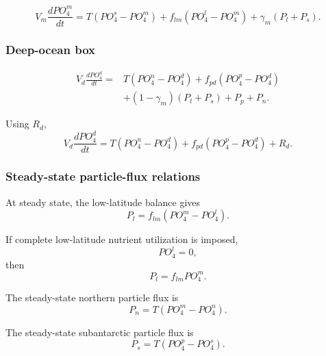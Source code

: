 \documentclass[11pt]{article}
\begin{document}
\begin{equation}
V_m\frac{dPO_4^m}{dt}
=
T\left(PO_4^s-PO_4^m\right)
+
f_{lm}\left(PO_4^l-PO_4^m\right)
+
\gamma_m\left(P_l+P_s\right).
\label{eq:six_po4_m}
\end{equation}

\subsubsection{Deep-ocean box}

\begin{equation}
\begin{split}
V_d\frac{dPO_4^d}{dt}
={}&
T\left(PO_4^n-PO_4^d\right)
+
f_{pd}\left(PO_4^p-PO_4^d\right)
\\
&+
\left(1-\gamma_m\right)
\left(P_l+P_s\right)
+
P_p+P_n.
\end{split}
\label{eq:six_po4_d}
\end{equation}

Using \(R_d\),
\begin{equation}
V_d\frac{dPO_4^d}{dt}
=
T\left(PO_4^n-PO_4^d\right)
+
f_{pd}\left(PO_4^p-PO_4^d\right)
+
R_d.
\label{eq:six_po4_d_compact}
\end{equation}

\subsubsection{Steady-state particle-flux relations}

At steady state, the low-latitude balance gives
\begin{equation}
P_l
=
f_{lm}\left(PO_4^m-PO_4^l\right).
\label{eq:six_Pl_steady}
\end{equation}

If complete low-latitude nutrient utilization is imposed,
\begin{equation}
PO_4^l=0,
\label{eq:six_po4_l_zero}
\end{equation}
then
\begin{equation}
P_l=f_{lm}PO_4^m.
\label{eq:six_Pl_constraint}
\end{equation}

The steady-state northern particle flux is
\begin{equation}
P_n
=
T\left(PO_4^m-PO_4^n\right).
\label{eq:six_Pn_steady}
\end{equation}

The steady-state subantarctic particle flux is
\begin{equation}
P_s
=
T\left(PO_4^p-PO_4^s\right).
\label{eq:six_Ps_steady}
\end{equation}
\end{document}
